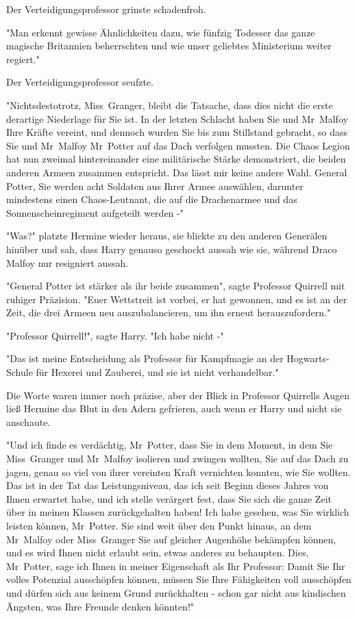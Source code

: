 {Der Verteidigungsprofessor grinste schadenfroh.

"Man erkennt gewisse Ähnlichkeiten dazu, wie fünfzig Todesser das ganze magische Britannien beherrschten und wie unser geliebtes Ministerium weiter regiert."

Der Verteidigungsprofessor seufzte.

"Nichtsdestotrotz, Miss~Granger, bleibt die Tatsache, dass dies nicht die erste derartige Niederlage für Sie ist. In der letzten Schlacht haben Sie und Mr~Malfoy Ihre Kräfte vereint, und dennoch wurden Sie bis zum Stillstand gebracht, so dass Sie und Mr~Malfoy Mr~Potter auf das Dach verfolgen mussten. Die Chaos Legion hat nun zweimal hintereinander eine militärische Stärke demonstriert, die beiden anderen Armeen zusammen entspricht. Das lässt mir keine andere Wahl. General Potter, Sie werden acht Soldaten aus Ihrer Armee auswählen, darunter mindestens einen Chaos-Leutnant, die auf die Drachenarmee und das Sonnenscheinregiment aufgeteilt werden -"

"Was?" platzte Hermine wieder heraus, sie blickte zu den anderen Generälen hinüber und sah, dass Harry genauso geschockt aussah wie sie, während Draco Malfoy nur resigniert aussah.

"General Potter ist stärker als ihr beide zusammen", sagte Professor Quirrell mit ruhiger Präzision. "Euer Wettstreit ist vorbei, er hat gewonnen, und es ist an der Zeit, die drei Armeen neu auszubalancieren, um ihn erneut herauszufordern."

"Professor Quirrell!", sagte Harry. "Ich habe nicht -"

"Das ist meine Entscheidung als Professor für Kampfmagie an der Hogwarts-Schule für Hexerei und Zauberei, und sie ist nicht verhandelbar."

Die Worte waren immer noch präzise, aber der Blick in Professor Quirrells Augen ließ Hermine das Blut in den Adern gefrieren, auch wenn er Harry und nicht sie anschaute.

"Und ich finde es verdächtig, Mr~Potter, dass Sie in dem Moment, in dem Sie Miss~Granger und Mr~Malfoy isolieren und zwingen wollten, Sie auf das Dach zu jagen, genau so viel von ihrer vereinten Kraft vernichten konnten, wie Sie wollten. Das ist in der Tat das Leistungsniveau, das ich seit Beginn dieses Jahres von Ihnen erwartet habe, und ich stelle verärgert fest, dass Sie sich die ganze Zeit über in meinen Klassen zurückgehalten haben! Ich habe gesehen, was Sie wirklich leisten können, Mr~Potter. Sie sind weit über den Punkt hinaus, an dem Mr~Malfoy oder Miss~Granger Sie auf gleicher Augenhöhe bekämpfen können, und es wird Ihnen nicht erlaubt sein, etwas anderes zu behaupten. Dies, Mr~Potter, sage ich Ihnen in meiner Eigenschaft als Ihr Professor: Damit Sie Ihr volles Potenzial ausschöpfen können, müssen Sie Ihre Fähigkeiten voll ausschöpfen und dürfen sich aus keinem Grund zurückhalten - schon gar nicht aus kindischen Ängsten, was Ihre Freunde denken könnten!"

}

